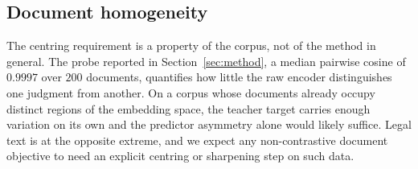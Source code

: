 \documentclass[conference]{IEEEtran}
\begin{document}
\subsection{Document homogeneity}
The centring requirement is a property of the corpus, not of the method in general.
The probe reported in Section~\ref{sec:method}, a median pairwise cosine of $0.9997$
over $200$ documents, quantifies how little the raw encoder distinguishes one
judgment from another. On a corpus whose documents already occupy distinct regions
of the embedding space, the teacher target carries enough variation on its own and
the predictor asymmetry alone would likely suffice. Legal text is at the opposite
extreme, and we expect any non-contrastive document objective to need an explicit
centring or sharpening step on such data.

\end{document}
